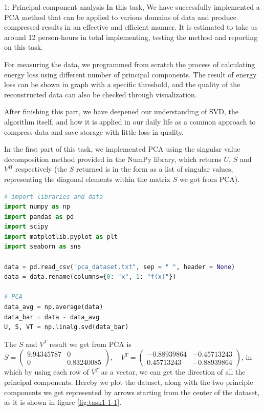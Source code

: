 \documentclass[10pt,a4paper]{article}
\begin{document}
\frontpage

\begin{task}{1: Principal component analysis}
\bigskip
In this task, We have successfully implemented a PCA method that can be applied to various domains of data and produce compressed results in an effective and efficient manner. It is estimated to take us around 12 person-hours in total implementing, testing the method and reporting on this task. 

For measuring the data, we programmed from scratch the process of calculating energy loss using different number of principal components. The result of energy loss can be shown in graph with a specific threshold, and the quality of the reconstructed data can also be checked through visualization.

After finishing this part, we have deepened our understanding of SVD, the algorithm itself, and how it is applied in our daily life as a common approach to compress data and save storage with little loss in quality.

\bigskip
{}


In the first part of this task, we implemented PCA using the singular value decomposition method provided in the NumPy library, which returns $U$, $S$ and $V^H$ respectively (the $S$ returned is in the form as a list of singular values, representing the diagonal elements within the matrix $S$ we got from PCA). 

\begin{lstlisting}[language = Python, label={decoupling}]
# import libraries and data
import numpy as np
import pandas as pd
import scipy
import matplotlib.pyplot as plt
import seaborn as sns

data = pd.read_csv("pca_dataset.txt", sep = " ", header = None)
data = data.rename(columns={0: "x", 1: "f(x)"})

# PCA
data_avg = np.average(data)
data_bar = data - data_avg
U, S, VT = np.linalg.svd(data_bar)
\end{lstlisting}

The $S$ and $V^T$ result we get from PCA is $
    S=\left(\begin{array}{cc}
        9.94345787 & 0 \\
        0 & 0.83240085
    \end{array}\right), \quad
    V^T=\left(\begin{array}{cc}
        -0.88939864 & -0.45713243 \\
        0.45713243 & -0.88939864
    \end{array}\right)$,
in which by using each row of $V^T$ as a vector, we can get the direction of all the principal components. Hereby we plot the dataset, along with the two principle components we get represented by arrows starting from the center of the dataset, as it is shown in figure \ref{fig:task1-1-1}.


\end{task}
\end{document}
